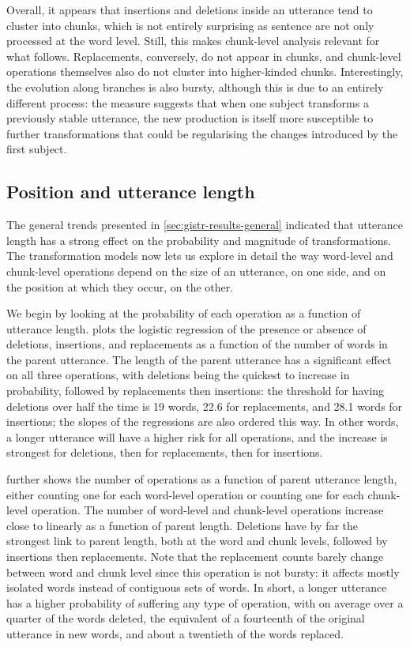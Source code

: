 \bigskip
Overall, it appears that insertions and deletions inside an utterance
tend to cluster into chunks, which is not entirely surprising as sentence
are not only processed at the word level. Still, this makes
chunk-level analysis relevant for what follows. Replacements,
conversely, do not appear in chunks, and chunk-level operations
themselves also do not cluster into higher-kinded chunks. Interestingly,
the evolution along branches is also bursty, although this is due to an
entirely different process: the measure suggests that when one subject
transforms a previously stable utterance, the new production is itself
more susceptible to further transformations that could be regularising
the changes introduced by the first subject.

\subsection{Position and utterance length}\label{position-and-utterance-length}

The general trends presented in \cref{sec:gistr-results-general}
indicated that utterance length has a strong effect on the probability
and magnitude of transformations. The transformation models now lets us
explore in detail the way word-level and chunk-level operations depend
on the size of an utterance, on one side, and on the position at which
they occur, on the other.

We begin by looking at the probability of each operation as a function
of utterance length.  plots the logistic
regression of the presence or absence of deletions, insertions, and
replacements as a function of the number of words in the parent
utterance. The length of the parent utterance has a significant effect
on all three operations, with deletions being the quickest to increase
in probability, followed by replacements then insertions: the threshold
for having deletions over half the time is 19 words, 22.6 for
replacements, and 28.1 words for insertions; the slopes of the
regressions are also ordered this way. In other words, a longer
utterance will have a higher risk for all operations, and the increase
is strongest for deletions, then for replacements, then for insertions.

 further shows the number of operations as a
function of parent utterance length, either counting one for each
word-level operation or counting one for each chunk-level operation. The
number of word-level and chunk-level operations increase close to
linearly as a function of parent length. Deletions have by far the
strongest link to parent length, both at the word and chunk levels,
followed by insertions then replacements. Note that the replacement
counts barely change between word and chunk level since this operation
is not bursty: it affects mostly isolated words instead of contiguous
sets of words. In short, a longer utterance has a higher probability of
suffering any type of operation, with on average over a quarter of the
words deleted, the equivalent of a fourteenth of the original utterance
in new words, and about a twentieth of the words replaced.

